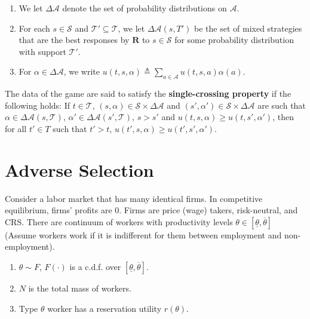 \documentclass[11pt]{elegantbook_2}
\begin{document}
\begin{enumerate}
    \item We let $\Delta \mathcal{A}$ denote the set of probability distributions on $\mathcal{A}$.
    \item For each $s\in \mathcal{S}$ and $\mathcal{T}'\subseteq \mathcal{T}$, we let $\Delta\mathcal{A}(s,T')$ be the set of mixed strategies that are the best responses by $\mathbf{R}$ to $s\in \mathcal{S}$ for some probability distribution with support $\mathcal{T}'$.
    \item For $\alpha\in \Delta\mathcal{A}$, we write $u(t,s,\alpha)\triangleq \sum_{a\in \mathcal{A}}u(t,s,a)\alpha(a)$.
\end{enumerate}

\begin{definition}
    The data of the game are said to satisfy the \textbf{single-crossing property} if the following holds: If $t\in \mathcal{T}$, $(s,\alpha)\in \mathcal{S}\times \Delta\mathcal{A}$ and $(s',\alpha')\in \mathcal{S}\times \Delta\mathcal{A}$ are such that $\alpha\in \Delta\mathcal{A}(s,\mathcal{T})$, $\alpha'\in \Delta\mathcal{A}(s',\mathcal{T})$, $s>s'$ and $u(t,s,\alpha)\geq u(t,s',\alpha')$, then for all $t'\in T$ such that $t'>t$, $u(t',s,\alpha)\geq u(t',s',\alpha')$.
\end{definition}

\section{Adverse Selection}
Consider a labor market that has many identical firms. In competitive equilibrium, firms' profits are $0$. Firms are price (wage) takers, risk-neutral, and CRS. There are continuum of workers with productivity levels $\theta\in\left[\underline{\theta},\overline{\theta}\right]$ (Assume workers work if it is indifferent for them between employment and non-employment).
\begin{enumerate}
    \item $\theta\sim F$, $F(\cdot)$ is a c.d.f. over $\left[\underline{\theta},\overline{\theta}\right]$.
    \item $N$ is the total mass of workers.
    \item Type $\theta$ worker has a reservation utility $r(\theta)$.
\end{enumerate}
\end{document}
